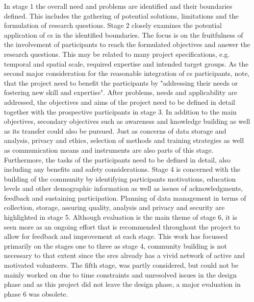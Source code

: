 
In stage 1 the overall need and problems are identified and their boundaries defined. This includes the gathering of potential solutions, limitations and the formulation of research questions. Stage 2 closely examines the potential application of \acrshort*{cs} in the identified boundaries. The focus is on the fruitfulness of the involvement of participants to reach the formulated objectives and answer the research questions. This may be related to many project specifications, e.g. temporal and spatial scale, required expertise and intended target groups. As the second major consideration for the reasonable integration of \acrshort*{cs} participants, \autocite[2]{fraislCitizenScienceEnvironmental2022} note, that the project need to benefit the participants by "addressing their needs or fostering new skill and expertise". After problems, needs and applicability are addressed, the objectives and aims of the project need to be defined in detail together with the prospective participants in stage 3. In addition to the main objectives, secondary objectives such as awareness and knowledge building as well as its transfer could also be pursued. Just as concerns of data storage and analysis, privacy and ethics, selection of methods and training strategies as well as communication means and instruments are also parts of this stage. Furthermore, the tasks of the participants need to be defined in detail, also including any benefits and safety considerations. Stage 4 is concerned with the building of the community by identifying participants motivations, education levels and other demographic information as well as issues of acknowledgments, feedback and sustaining participation. Planning of data management in terms of collection, storage, assuring quality, analysis and privacy and security are highlighted in stage 5. Although evaluation is the main theme of stage 6, it is seen more as an ongoing effort that is recommended throughout the project to allow for feedback and improvement at each stage.
This work has focussed primarily on the stages one to three as stage 4, community building is not necessary to that extent since the \acrshort*{srcs} already has a vivid network of active and motivated volunteers. The fifth stage, was partly considered, but could not be mainly worked on due to time constraints and unresolved issues in the design phase and as this project did not leave the design phase, a major evaluation in phase 6 was obsolete. %

